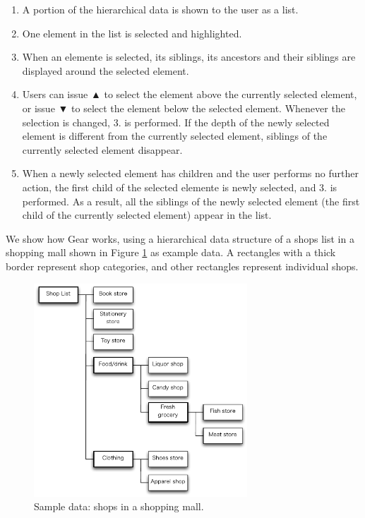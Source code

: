 \documentclass{article}
\def\up{▲}
\def\down{▼}
\begin{document}
\begin{enumerate}
\item A portion of the hierarchical data is shown to the user as a list.

\item One element in the list is selected and highlighted.


\item When an elemente is selected, its siblings, its ancestors and their siblings are displayed
around the selected element.

\item Users can issue {\up} to select the element above the currently selected element,
or issue {\down} to select the element below the selected element.
Whenever the selection is changed, 3. is performed.
If the depth of the newly selected element is different from the currently
selected element, siblings of the currently selected element disappear.

\item When a newly selected element has children and the user performs no further action,
the first child of the selected elemente is newly selected, and 3. is performed.
As a result, all the siblings of the newly selected element
(the first child of the currently selected element) appear in the list.

\end{enumerate}

We show how Gear works, using a hierarchical data structure of
a shops list in a shopping mall shown in Figure \ref{fig1} as example data.
A rectangles with a thick border represent shop categories, and
other rectangles represent individual shops.

\begin{figure}[H]
\centerline{\includegraphics[width=80mm,bb=0 0 490 490]{figures/fig1.pdf}}
\caption{Sample data: shops in a shopping mall.}
\label{fig1}
\end{figure}
\end{document}
